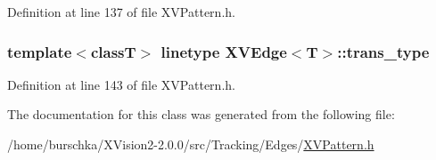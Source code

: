 Definition at line 137 of file XVPattern.h.\label{XVEdge_o1}
\hypertarget{class_XVEdge_o1}{
\subsubsection[trans_type]{\setlength{\rightskip}{0pt plus 5cm}template$<$classT$>$ linetype XVEdge$<$T$>$::trans\_\-type}}




Definition at line 143 of file XVPattern.h.

The documentation for this class was generated from the following file:\begin{CompactItemize}
\item 
/home/burschka/XVision2-2.0.0/src/Tracking/Edges/\hyperlink{XVPattern.h-source}{XVPattern.h}\end{CompactItemize}
